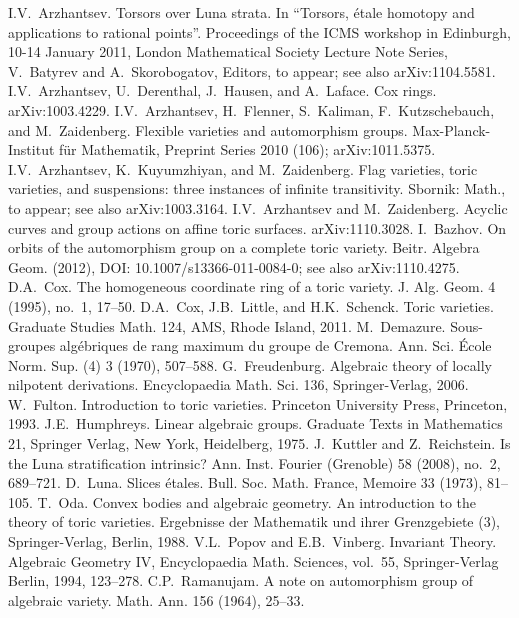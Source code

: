 \documentclass[12pt,a4paper]{amsart}
\theoremstyle{plain}
\theoremstyle{definition}
\begin{document}
\begin{thebibliography}{}
I.V.~Arzhantsev.
Torsors over Luna strata. In
``Torsors, \'etale homotopy and applications to rational points''.
Proceedings of the ICMS workshop in Edinburgh, 10-14 January 2011,
London Mathematical Society Lecture Note Series, V.~Batyrev and A.~Skorobogatov, Editors,
to appear; see also arXiv:1104.5581.
I.V.~Arzhantsev, U.~Derenthal, J.~Hausen, and A.~Laface.
Cox rings. arXiv:1003.4229.
I.V.~Arzhantsev, H.~Flenner, S.~Kaliman, F.~Kutzschebauch, and M.~Zaidenberg.
Flexible varieties and automorphism groups.
Max-Planck-Institut f\"ur Mathematik,
Preprint Series 2010 (106); arXiv:1011.5375.
I.V.~Arzhantsev, K.~Kuyumzhiyan, and M.~Zaidenberg.
Flag varieties, toric varieties, and suspensions:
three instances of infinite transitivity.
Sbornik: Math., to appear; see also arXiv:1003.3164.
I.V.~Arzhantsev and M.~Zaidenberg.
Acyclic curves and group actions on affine toric surfaces.
arXiv:1110.3028.
I.~Bazhov. On orbits of the automorphism group on a complete toric variety.
Beitr. Algebra Geom. (2012), DOI: 10.1007/s13366-011-0084-0; see also
arXiv:1110.4275.
D.A.~Cox. The homogeneous coordinate ring of a toric variety.
J. Alg. Geom. 4 (1995), no.~1, 17--50.
D.A.~Cox, J.B.~Little, and H.K.~Schenck. Toric varieties.
Graduate Studies Math. 124, AMS, Rhode Island, 2011.
M.\ Demazure. Sous-groupes alg\'{e}briques de rang maximum du
groupe de Cremona. Ann. Sci. \'Ecole Norm. Sup. (4) {3} (1970),
507--588.
G.\ Freudenburg. Algebraic theory of locally nilpotent
derivations. Encyclopaedia Math. Sci. 136, Springer-Verlag, 2006.
W.~Fulton.
Introduction to toric varieties.
Princeton University Press, Princeton, 1993.
J.E.~Humphreys.
Linear algebraic groups.
Graduate Texts in Mathematics 21,
Springer Verlag,
New York, Heidelberg, 1975.
J.~Kuttler and Z.~Reichstein.
Is the Luna stratification intrinsic?
Ann. Inst. Fourier (Grenoble) 58 (2008), no.~2, 689--721.
D.~Luna. Slices \'etales. Bull. Soc. Math. France,
Memoire 33 (1973), 81--105.
T.~Oda.
Convex bodies and algebraic geometry.
An introduction to the theory of toric varieties.
Ergebnisse der Mathematik und ihrer Grenzgebiete (3),
Springer-Verlag, Berlin, 1988.
V.L.~Popov and E.B.~Vinberg. Invariant Theory.
Algebraic Geometry IV, Encyclopaedia Math. Sciences, vol.~55,
Springer-Verlag Berlin, 1994, 123--278.
C.P.~Ramanujam. A note on automorphism group of algebraic
variety. Math. Ann. 156 (1964), 25--33.
\end{thebibliography}
\end{document}

